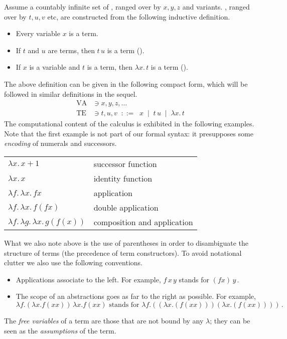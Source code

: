\documentclass[12pt]{article}
\begin{document}
\begin{mydefinition}
Assume a countably infinite set of , ranged over by $x,y,z$ and variants.
, ranged over by $t,u,v$ etc, are constructed from the following inductive definition.
\begin{itemize}
  \item Every variable $x$ is a term.
  \item If $t$ and $u$ are terms, then $t\,u$ is a term ().
  \item If $x$ is a variable and $t$ is a term, then $\lambda x.\,t$ is a term (). \deq
\end{itemize}
\end{mydefinition}
The above definition can be given in the following compact form, which will be followed in similar definitions in the sequel.
\begin{align*}
    \mathrm{VA} &\ni x,y,z,\dots \\
    \mathrm{TE} &\ni t,u,v \;\; ::= \;\; x \; \mid \; {t\,u} \; \mid \; {\lambda x . \, t}
\end{align*}
%
The computational content of the calculus is exhibited in the following examples.
Note that the first example is not part of our formal syntax: it presupposes some \emph{encoding} of numerals and successors.
\begin{center}
\begin{tabular}{l@{\quad}l}
$\lambda x. \, x+1$ & successor function \\
$\lambda x . \, x$ & identity function \\
$ \lambda f . \, \lambda x. \, fx$ & application \\
$\lambda f. \, \lambda x. \, f(fx)$ & double application \\
$\lambda f. \, \lambda g. \, \lambda x. \, g(f(x))$ & composition and application
\end{tabular}
\end{center}
What we also note above is the use of parentheses in order to disambiguate the structure of terms (\ie the precedence of term constructors). To avoid notational clutter we also use the following conventions.
\begin{itemize}
  \item Applications associate to the left. For example, $f\,x\,y$ stands for $(fx)\,y$\,.
  \item The scope of an abstractions goes as far to the right as possible. For example,
  \[ \lambda f.(\lambda x.f(xx))\,\lambda x.f(xx)\text{ \ stands for \ }\lambda f.((\lambda x.(f(xx)))(\lambda x.(f(xx))))\,. \]
\end{itemize}
The \emph{free variables} of a term are those that are not bound by any $\lambda$; they can be seen as the \emph{assumptions} of the term.
\end{document}
